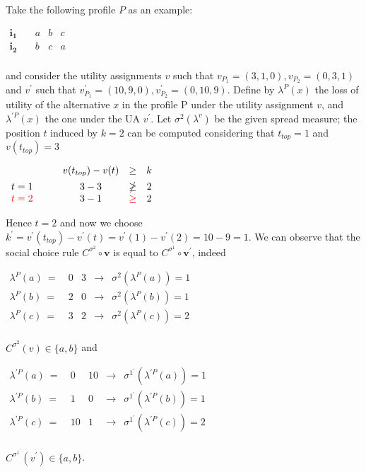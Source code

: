 \documentclass[version=3.21, pagesize, notitlepage, twoside=off, bibliography=totoc, DIV=calc, fontsize=12pt, a4paper]{scrartcl}
\newcommand{\vpr}{\mathbf{v}}
\begin{document}
\begin{example}
	Take the following profile $P$ as an example:
	\begin{center}
		$
		\begin{array}{cccc}
		\mathbf{i_1} \quad &a&b&c\\
		\mathbf{i_2} \quad &b&c&a\\
		\end{array}
		$
	\end{center}

	and consider the utility assignments $v$ such that $v_{P_1}=(3,1,0) , v_{P_2}=(0,3,1)$ and $v^\prime$ such that $v^\prime_{P_1}=(10,9,0) , v^\prime_{P_2}=(0,10,9)$. Define by $\lambda^P(x)$ the loss of utility of the alternative $x$ in the profile P under the utility assignment $v$, and $\lambda^{\prime P}(x)$ the one under the UA $v^\prime$. Let $\sigma^2(\lambda^v)$ be the given spread measure; the position $t$ induced by $k=2$ can be computed considering that $t_{top} = 1$ and $v(t_{top})=3$
	\begin{center}
		$ 
		\begin{array}{cccc}
		& v(t_{top})-v(t) &\geq &k \vspace{1.5mm} \\ 
		t=1 \qquad & 3 - 3 &\ngeq &2 \\
		\color{red}t=2 \qquad & 3 - 1 &\color{red}\geq &2 \\
		\end{array}
		$
	\end{center}
	Hence $t=2$ and now we choose $k^\prime = v^\prime(t_{top})-v^\prime(t)= v^\prime(1)-v^\prime(2)=10-9=1$. We can observe that the social choice rule $C^{\sigma^2} \circ \vpr$ is equal to $C^{\sigma^1} \circ \vpr^\prime$, indeed
	\begin{center}
		$
		\begin{array}{ccccc}
		\lambda^P(a) \ = \ &0&3 & \rightarrow & \sigma^2(\lambda^P(a)) = 1\\
		\lambda^P(b) \ = \ &2&0 & \rightarrow & \sigma^2(\lambda^P(b)) = 1\\
		\lambda^P(c) \ = \ &3&2 & \rightarrow & \sigma^2(\lambda^P(c)) = 2\\
		\end{array}
		$
	\end{center}
	$C^{\sigma^2}(v)\in \{a,b\}$ and
	\begin{center}
		$
		\begin{array}{ccccc}
		\lambda^{\prime P}(a) \ = \ &0&10 & \rightarrow & \sigma^{1^\prime}(\lambda^{\prime P}(a)) = 1\\
		\lambda^{\prime P}(b) \ = \ &1&0 & \rightarrow & \sigma^{1^\prime}(\lambda^{\prime P}(b)) = 1\\
		\lambda^{\prime P}(c) \ = \ &10&1 & \rightarrow & \sigma^{1^\prime}(\lambda^{\prime P}(c)) = 2\\
		\end{array}
		$
	\end{center}
	$C^{\sigma^{1^\prime}}(v^\prime)\in \{a,b\}$.
\end{example}
\end{document}
